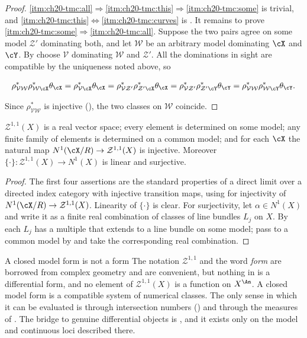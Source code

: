 \begin{proof}
\cref{itm:ch20-tmc:all}$\Rightarrow$\cref{itm:ch20-tmc:this}$\Rightarrow$\cref{itm:ch20-tmc:some}
is trivial, and \cref{itm:ch20-tmc:this}$\Leftrightarrow$\cref{itm:ch20-tmc:curves}
is .  It remains to prove
\cref{itm:ch20-tmc:some}$\Rightarrow$\cref{itm:ch20-tmc:all}.  Suppose the
two pairs agree on some model $\mathcal Z'$ dominating both, and let $\mathcal W$ be
an arbitrary model dominating $\cX$ and $\cY$.  By
 choose $\mathcal V$ dominating $\mathcal W$ and
$\mathcal Z'$.  All the dominations in sight are compatible by the uniqueness
noted above, so

\[
 \rho_{\mathcal V\mathcal W}^*\rho_{\mathcal W\cX}^*\theta_{\cX}
 =\rho_{\mathcal V\cX}^*\theta_{\cX}
 =\rho_{\mathcal V\mathcal Z'}^*\rho_{\mathcal Z'\cX}^*\theta_{\cX}
 =\rho_{\mathcal V\mathcal Z'}^*\rho_{\mathcal Z'\cY}^*\theta_{\cY}
 =\rho_{\mathcal V\mathcal W}^*\rho_{\mathcal W\cY}^*\theta_{\cY}.
\]

Since $\rho_{\mathcal V\mathcal W}^*$ is injective
(), the two classes on $\mathcal W$ coincide.
\end{proof}

\begin{corollary}
\label{cor:ch20-limit-structure}
$\mathcal Z^{1,1}(X)$ is a real vector space; every element is determined on some
model; any finite family of elements is determined on a common model; and
for each $\cX$ the natural map $N^1(\cX/R)\to\mathcal Z^{1,1}(X)$ is injective.
Moreover $\{\cdot\}:\mathcal Z^{1,1}(X)\to N^1(X)$ is linear and surjective.
\end{corollary}

\begin{proof}
The first four assertions are the standard properties of a direct limit over
a directed index category with injective transition maps, using
 for injectivity of
$N^1(\cX/R)\to\mathcal Z^{1,1}(X)$.  Linearity of $\{\cdot\}$ is clear.  For
surjectivity, let $\alpha\in N^1(X)$ and write it as a finite real
combination of classes of line bundles $L_j$ on $X$.  By
 each $L_j$ has a multiple that extends
to a line bundle on some model; pass to a common model by
 and take the corresponding real combination.
\end{proof}

\begin{warning}{A closed model form is not a form}
The notation $\mathcal Z^{1,1}$ and the word \emph{form} are borrowed from
complex geometry and are convenient, but nothing in
 is a differential form, and no element of
$\mathcal Z^{1,1}(X)$ is a function on $X^{\An}$.  A closed model form is a
compatible system of numerical classes.  The only sense in which it can be
evaluated is through intersection numbers
() and through the measures of
.  The bridge to genuine differential objects is
, and it exists only on the model and
continuous loci described there.
\end{warning}


